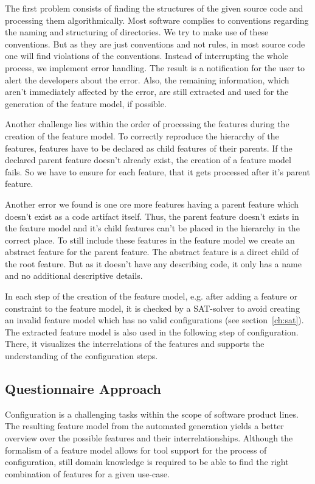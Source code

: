The first problem consists of finding the structures of the given source code and processing them algorithmically. Most software complies to conventions regarding the naming and structuring of directories. We try to make use of these conventions. But as they are just conventions and not rules, in most source code one will find violations of the conventions. Instead of interrupting the whole process, we implement error handling. The result is a notification for the user to alert the developers about the error. Also, the remaining information, which aren't immediately affected by the error, are still extracted and used for the generation of the feature model, if possible.

Another challenge lies within the order of processing the features during the creation of the feature model. To correctly reproduce the hierarchy of the features, features have to be declared as child features of their parents. If the declared parent feature doesn't already exist, the creation of a feature model fails. So we have to ensure for each feature, that it gets processed after it's parent feature.

Another error we found is one ore more features having a parent feature which doesn't exist as a code artifact itself. Thus, the parent feature doesn't exists in the feature model and it's child features can't be placed in the hierarchy in the correct place. To still include these features in the feature model we create an abstract feature for the parent feature. The abstract feature is a direct child of the root feature. But as it doesn't have any describing code, it only has a name and no additional descriptive details.

In each step of the creation of the feature model, e.g. after adding a feature or constraint to the feature model, it is checked by a SAT-solver to avoid creating an invalid feature model which has no valid configurations (see section~\ref{ch:sat}). The extracted feature model is also used in the following step of configuration. There, it visualizes the interrelations of the features and supports the understanding of the configuration steps.


\subsection{Questionnaire Approach}
Configuration is a challenging tasks within the scope of software product lines. The resulting feature model from the automated generation yields a better overview over the possible features and their interrelationships. Although the formalism of a feature model allows for tool support for the process of configuration, still domain knowledge is required to be able to find the right combination of features for a given use-case.

